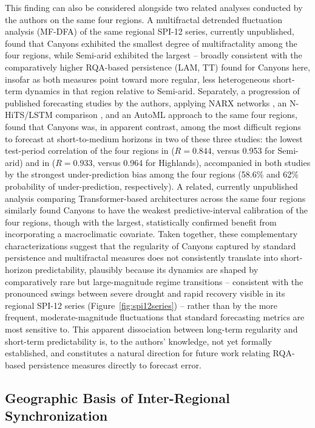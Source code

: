 \documentclass[climate,article,submit,moreauthors]{Definitions/mdpi}
\begin{document}
This finding can also be considered alongside two related analyses conducted by the
authors on the same four regions. A multifractal detrended fluctuation analysis (MF-DFA)
of the same regional SPI-12 series, currently unpublished, found that Canyons exhibited
the smallest degree of multifractality among the four regions, while Semi-arid exhibited
the largest -- broadly consistent with the comparatively higher RQA-based persistence
(LAM, TT) found for Canyons here, insofar as both measures point toward more regular,
less heterogeneous short-term dynamics in that region relative to Semi-arid. Separately,
a progression of published forecasting studies by the authors, applying NARX networks
\cite{magallanes2022}, an N-HiTS/LSTM comparison \cite{magallanes2024a}, and an
AutoML approach \cite{magallanes2024b} to the same four regions, found that Canyons
was, in apparent contrast, among the most difficult regions to forecast at short-to-medium
horizons in two of these three studies: the lowest test-period correlation of the four
regions in \cite{magallanes2022} ($R=0.844$, versus 0.953 for Semi-arid) and in
\cite{magallanes2024b} ($R=0.933$, versus 0.964 for Highlands), accompanied in both
studies by the strongest under-prediction bias among the four regions (58.6\% and 62\%
probability of under-prediction, respectively). A related, currently unpublished analysis
comparing Transformer-based architectures across the same four regions similarly found
Canyons to have the weakest predictive-interval calibration of the four regions, though
with the largest, statistically confirmed benefit from incorporating a macroclimatic
covariate. Taken together, these complementary characterizations suggest that the
regularity of Canyons captured by standard persistence and multifractal measures does
not consistently translate into short-horizon predictability, plausibly because its dynamics
are shaped by comparatively rare but large-magnitude regime transitions -- consistent with
the pronounced swings between severe drought and rapid recovery visible in its regional
SPI-12 series (Figure~\ref{fig:spi12series}) -- rather than by the more frequent,
moderate-magnitude fluctuations that standard forecasting metrics are most sensitive to.
This apparent dissociation between long-term regularity and short-term predictability is,
to the authors' knowledge, not yet formally established, and constitutes a natural
direction for future work relating RQA-based persistence measures directly to forecast
error.

\subsection{Geographic Basis of Inter-Regional Synchronization}
\label{sec:disc-sync}
\end{document}
